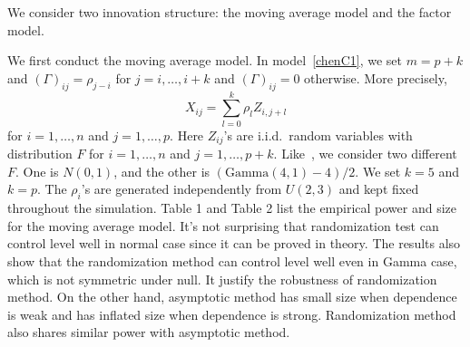 \documentclass[review]{elsarticle}
\theoremstyle{plain}
\theoremstyle{definition}
\theoremstyle{remark}
\begin{document}
We consider two innovation structure: the moving average model and the factor model.

We first conduct the moving average model. In model~\eqref{chenC1}, we set $m=p+k$ and ${(\Gamma)}_{ij}=\rho_{j-i}$ for $j=i,\ldots, i+k$ and ${(\Gamma)}_{ij}=0$ otherwise. More precisely,
\begin{equation}
    X_{ij}=\sum_{l=0}^k \rho_{l}Z_{i,j+l}
\end{equation}
for $i=1,\ldots, n$ and $j=1,\ldots, p$. Here $Z_{ij}$'s are i.i.d.\ random variables with distribution $F$ for $i=1,\ldots, n$ and $j=1,\ldots, p+k$. 
Like~\cite{Chen2010A}, we consider two different $F$.
One is $N(0,1)$, and the other is $(\textrm{Gamma}(4,1)-4)/2$.
We set $k=5$ and $k=p$.
The $\rho_i$'s are generated independently from $U(2,3)$ and kept fixed throughout the simulation.
Table 1 and Table 2 list the empirical power and size for the moving average model.
It's not surprising that randomization test can control level well in normal case since it can be proved in theory.
The results also show that the randomization method can control level well even in Gamma case, which is not symmetric under null.
It justify the robustness of randomization method.
On the other hand, asymptotic method has small size when dependence is weak and has inflated size when dependence is strong.
Randomization method also shares similar power with asymptotic method. 
\end{document}
